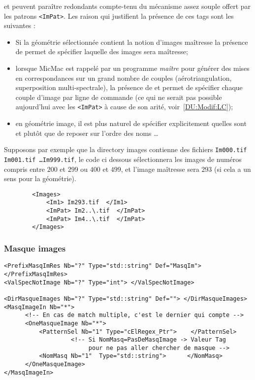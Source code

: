 {\tt <Im1>} et {\tt <Im2>}  peuvent para\^itre redondants compte-tenu du m\'ecanisme
assez souple offert par les patrons {\tt <ImPat>}. Les raison qui justifient
la pr\'esence de ces tags sont les suivantes :

\begin{itemize}
   \item Si la g\'eom\'etrie s\'electionn\'ee contient la notion d'images ma\^itresse 
         la pr\'esence de {\tt <Im1>} permet de sp\'ecifier laquelle des images sera
         ma\^itresse;
 
   \item lorsque MicMac est rappel\'e  par un programme \emph{ma\^itre} pour g\'en\'erer
         des mises en correspondances sur un grand nombre de couples (a\'erotriangulation,
         superposition multi-spectrale), la pr\'esence de {\tt <Im1>} et {\tt <Im2>}
         permet de sp\'ecifier chaque couple d'image par ligne de commande (ce qui ne
         serait pas possible aujourd'hui avec les {\tt <ImPat>} \`a cause de son
         arit\'e, voir~\ref{DU:Modif:LC});

   \item  en g\'eom\'etrie image, il est plus naturel de sp\'ecifier 
         explicitement quelles sont {\tt <Im1>} et {\tt <Im2>}  plut\^ot que
         de reposer sur l'ordre des noms  \dots
\end{itemize}

Supposons par exemple que la directory images contienne des fichiers
{\tt Im000.tif Im001.tif \dots Im999.tif}, le code ci dessous s\'electionnera
les images de num\'eros compris entre $200$ et $299$ ou $400$ et $499$, et
l'image ma\^itresse sera $293$ (si cela  a un sens pour la g\'eom\'etrie).

\begin{verbatim}
        <Images>
            <Im1> Im293.tif  </Im1>     
            <ImPat> Im2..\.tif  </ImPat>
            <ImPat> Im4..\.tif  </ImPat>
        </Images>
\end{verbatim}

\subsubsection{Masque images}

{\small
\begin{verbatim}
<PrefixMasqImRes Nb="?" Type="std::string" Def="MasqIm">    </PrefixMasqImRes>
<ValSpecNotImage Nb="?" Type="int"> </ValSpecNotImage>

<DirMasqueImages Nb="?" Type="std::string" Def=""> </DirMasqueImages>
<MasqImageIn Nb="*">
      <!-- En cas de match multiple, c'est le dernier qui compte -->
      <OneMasqueImage Nb="*">
          <PatternSel Nb="1" Type="cElRegex_Ptr">    </PatternSel>
                   <!-- Si NomMasq=PasDeMasqImage -> Valeur Tag
                        pour ne pas aller chercher de masque -->
          <NomMasq Nb="1"  Type="std::string">      </NomMasq>
      </OneMasqueImage>
</MasqImageIn>
\end{verbatim}
}

